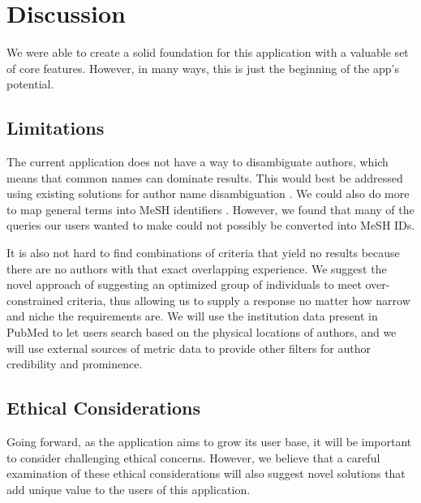 \section{Discussion}

We were able to create a solid foundation for this application with a valuable set of core features. However, in many ways, this is just the beginning of the app's potential.

\subsection{Limitations}

The current application does not have a way to disambiguate authors, which means that common names can dominate results. This would best be addressed using existing solutions for author name disambiguation \cite{ref-approach-author-name-disambiguation, ref-openalex}. We could also do more to map general terms into MeSH identifiers \cite{ref-approach-gilda}. However, we found that many of the queries our users wanted to make could not possibly be converted into MeSH IDs.

It is also not hard to find combinations of criteria that yield no results because there are no authors with that exact overlapping experience. We suggest the novel approach of suggesting an optimized group of individuals to meet over-constrained criteria, thus allowing us to supply a response no matter how narrow and niche the requirements are. We will use the institution data present in PubMed to let users search based on the physical locations of authors, and we will use external sources of metric data to provide other filters for author credibility and prominence.

\subsection{Ethical Considerations}

Going forward, as the application aims to grow its user base, it will be important to consider challenging ethical concerns. However, we believe that a careful examination of these ethical considerations will also suggest novel solutions that add unique value to the users of this application.

